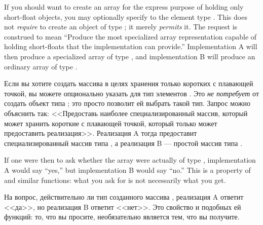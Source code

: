 If you should want to create an array for the
express purpose of holding only short-float objects, you may
optionally specify to  the element type
.  This does not \textit{require}  to create
an object of type ; it merely \textit{permits} it.  The
request is construed to mean ``Produce the most specialized array
representation capable of holding short-floats that the implementation
can provide.''  Implementation A will then produce a specialized
array of type , and implementation B
will produce an ordinary array of type .

Если вы хотите создать массива в целях хранения только коротких с плавающей
точкой, вы можете опционально указать для  тип элементов
. Это \textit{не потребует} от  создать объект типа
; это просто позволит ей выбрать такой тип. Запрос
можно объяснить так: <<Предоставь наиболее специализированный массив, который
может хранить короткие с плавающей точкой, который только может предоставить
реализация>>. Реализация A тогда предоставит специализированный массив типа
, а реализация B --- простой массив типа .

If one were then to ask whether the array were actually of type
, implementation A would say ``yes,'' but
implementation B would say ``no.''  This is a property of 
and similar functions: what you ask for is not necessarily what you get. 

На вопрос, действительно ли тип созданного массива ,
реализация A ответит <<да>>, но реализация B ответит <<нет>>. Это свойство
 и подобных ей функций: то, что вы просите, необязательно
является тем, что вы получите.

